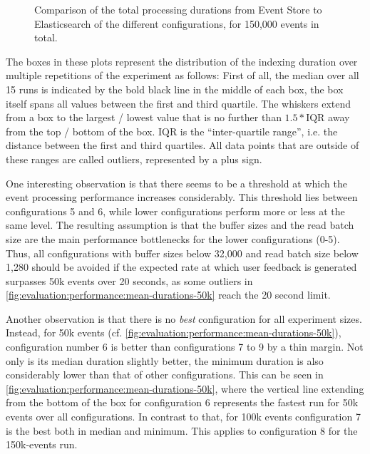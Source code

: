 \begin{figure}[h]
        \caption{Comparison of the total processing durations from Event Store to Elasticsearch of the different configurations, for 150,000 events in total.}
        \label{fig:evaluation:performance:mean-durations-150k}
\end{figure}

The boxes in these plots represent the distribution of the indexing duration over multiple repetitions of the experiment as follows:
First of all, the median over all 15 runs is indicated by the bold black line in the middle of each box, the box itself spans all values between the first and third quartile.
The whiskers extend from a box to the largest / lowest value that is no further than $ 1.5 * \text{IQR} $ away from the top / bottom of the box.
$\text{IQR}$ is the ``inter-quartile range'', i.e. the distance between the first and third quartiles.
All data points that are outside of these ranges are called outliers, represented by a plus sign.

One interesting observation is that there seems to be a threshold at which the event processing performance increases considerably.
This threshold lies between configurations 5 and 6, while lower configurations perform more or less at the same level.
The resulting assumption is that the buffer sizes and the read batch size are the main performance bottlenecks for the lower configurations (0-5).
Thus, all configurations with buffer sizes below 32,000 and read batch size below 1,280 should be avoided if the expected rate at which user feedback is generated surpasses 50k events over 20 seconds, as some outliers in \cref{fig:evaluation:performance:mean-durations-50k} reach the 20 second limit.

Another observation is that there is no \emph{best} configuration for all experiment sizes.
Instead, for 50k events (cf. \cref{fig:evaluation:performance:mean-durations-50k}), configuration number 6 is better than configurations 7 to 9 by a thin margin.
Not only is its median duration slightly better, the minimum duration is also considerably lower than that of other configurations.
This can be seen in \cref{fig:evaluation:performance:mean-durations-50k}, where the vertical line extending from the bottom of the box for configuration 6 represents the fastest run for 50k events over all configurations.
In contrast to that, for 100k events configuration 7 is the best both in median and minimum.
This applies to configuration 8 for the 150k-events run.

